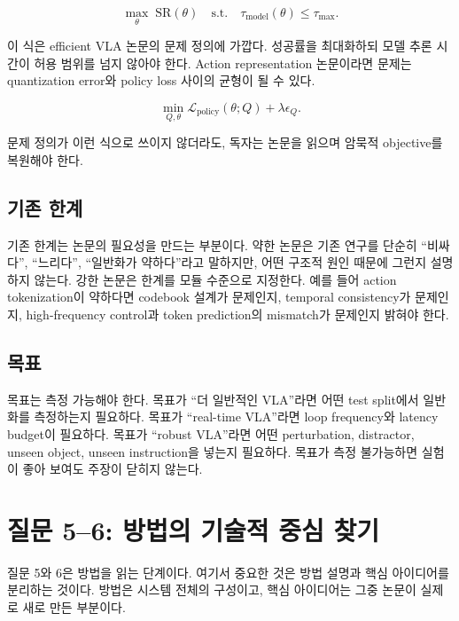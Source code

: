 \begin{equation}
  \max_\theta \; \mathrm{SR}(\theta)
  \quad
  \mathrm{s.t.}
  \quad
  \tau_{\mathrm{model}}(\theta) \le \tau_{\max}.
  \label{eq:problem_efficiency}
\end{equation}

이 식은 efficient VLA 논문의 문제 정의에 가깝다. 성공률을 최대화하되 모델 추론 시간이 허용 범위를 넘지 않아야 한다. Action representation 논문이라면 문제는 quantization error와 policy loss 사이의 균형이 될 수 있다.

\begin{equation}
  \min_{Q,\theta}
  \mathcal{L}_{\mathrm{policy}}(\theta; Q)
  +
  \lambda \epsilon_Q.
  \label{eq:problem_tokenization}
\end{equation}

문제 정의가 이런 식으로 쓰이지 않더라도, 독자는 논문을 읽으며 암묵적 objective를 복원해야 한다.

\subsection{기존 한계}

기존 한계는 논문의 필요성을 만드는 부분이다. 약한 논문은 기존 연구를 단순히 ``비싸다'', ``느리다'', ``일반화가 약하다''라고 말하지만, 어떤 구조적 원인 때문에 그런지 설명하지 않는다. 강한 논문은 한계를 모듈 수준으로 지정한다. 예를 들어 action tokenization이 약하다면 codebook 설계가 문제인지, temporal consistency가 문제인지, high-frequency control과 token prediction의 mismatch가 문제인지 밝혀야 한다.

\subsection{목표}

목표는 측정 가능해야 한다. 목표가 ``더 일반적인 VLA''라면 어떤 test split에서 일반화를 측정하는지 필요하다. 목표가 ``real-time VLA''라면 loop frequency와 latency budget이 필요하다. 목표가 ``robust VLA''라면 어떤 perturbation, distractor, unseen object, unseen instruction을 넣는지 필요하다. 목표가 측정 불가능하면 실험이 좋아 보여도 주장이 닫히지 않는다.

\section{질문 5--6: 방법의 기술적 중심 찾기}

질문 5와 6은 방법을 읽는 단계이다. 여기서 중요한 것은 방법 설명과 핵심 아이디어를 분리하는 것이다. 방법은 시스템 전체의 구성이고, 핵심 아이디어는 그중 논문이 실제로 새로 만든 부분이다.

